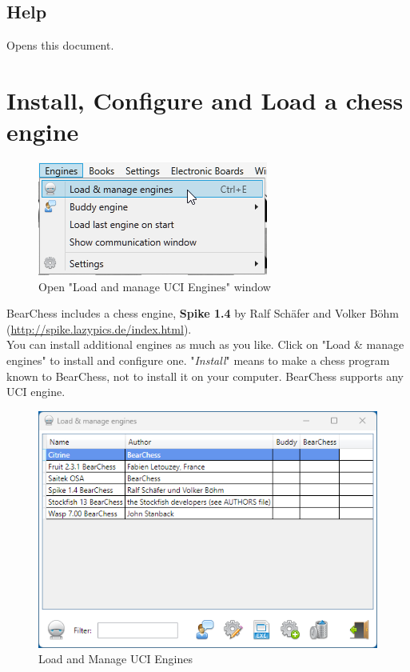 \documentclass[11pt,a4paper]{article}
\begin{document}
	\subsection{Help}
	Opens this document.
	
	\section{Install, Configure and Load a chess engine} \label{loadEngines}
	
	\begin{figure}[H]
		\centering
		\includegraphics[scale=1.0]{LoadEngine.png}
		\caption{Open "Load and manage UCI Engines" window}
		\label{fig:LoadEngine}
	\end{figure}
	BearChess includes a chess engine, \textbf{Spike 1.4} by Ralf Schäfer and Volker Böhm (\url{http://spike.lazypics.de/index.html}).\\ You can install additional engines as much as you like. Click on "Load \& manage engines" to install and configure one. "\textit{Install}" means to make a chess program known to BearChess, not to install it on your computer. BearChess supports any UCI engine.\\
	\begin{figure}[H]
		\centering
		\includegraphics[scale=0.8]{LoadManageEngine1.png}
		\caption{Load and Manage UCI Engines}
		\label{fig:LoadManageEngine1}
	\end{figure}
	
\end{document}
